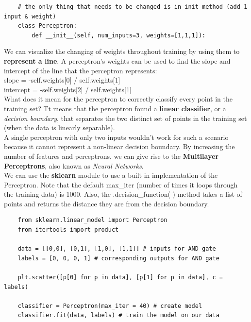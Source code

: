 \documentclass[11pt, a4paper]{article}
\begin{document}
\begin{spacing}{1.1}
	\begin{lstlisting}
	# the only thing that needs to be changed is in init method (add 1 input & weight)
	class Perceptron:
		def __init__(self, num_inputs=3, weights=[1,1,1]): \end{lstlisting} \vspace*{1mm}
	We can visualize the changing of weights throughout training by using them to \textbf{represent a line}. A perceptron’s weights can be used to find the slope and intercept of the line that the perceptron represents: \\
	\hspace*{4mm} slope = -self.weights[0] / self.weights[1] \\
	\hspace*{4mm} intercept = -self.weights[2] / self.weights[1] \vspace*{2mm} \\
	What does it mean for the perceptron to correctly classify every point in the training set? Tt means that the perceptron found a \textbf{linear classifier}, or a \textit{decision boundary}, that separates the two distinct set of points in the training set (when the data is linearly separable). \vspace*{1mm} \\
	A single perceptron with only two inputs wouldn't work for such a scenario because it cannot represent a non-linear decision boundary. By increasing the number of features and perceptrons, we can give rise to the \textbf{Multilayer Perceptrons}, also known as \textit{Neural Networks}. \vspace*{2mm} \\
	We can use the \textbf{sklearn} module to use a built in implementation of the Perceptron. Note that the default max\_iter (number of times it loops through the training data) is 1000. Also, the .decision\_function( ) method takes a list of points and returns the distance they are from the decision boundary. 
	\begin{lstlisting}
	from sklearn.linear_model import Perceptron
	from itertools import product
	
	data = [[0,0], [0,1], [1,0], [1,1]] # inputs for AND gate
	labels = [0, 0, 0, 1] # corresponding outputs for AND gate
	
	plt.scatter([p[0] for p in data], [p[1] for p in data], c = labels)
	
	classifier = Perceptron(max_iter = 40) # create model
	classifier.fit(data, labels) # train the model on our data
	

\end{lstlisting}
\end{spacing}
\end{document}
